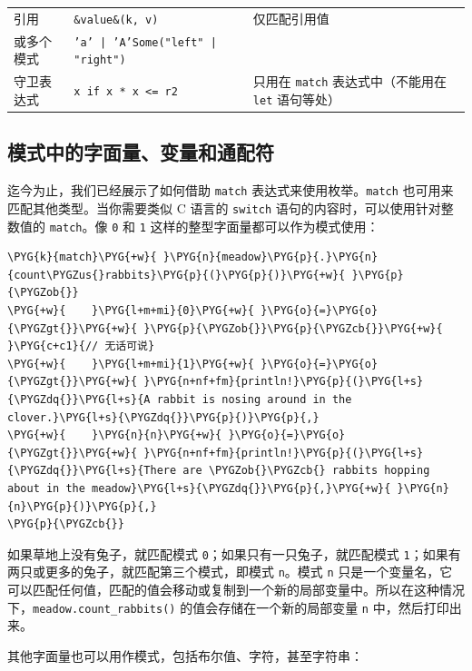 \begin{xltabular}{\textwidth}{@{}>{\hsize\raggedright\arraybackslash}X>{\hsize\raggedright\arraybackslash}X>{\hsize\raggedright\arraybackslash}X@{}}
引用 & \texttt{\&value}\newline{}\texttt{\&(k, v)} & 仅匹配引用值 \\
或多个模式 & \texttt{'a' | 'A'}\newline{}\texttt{Some("left" | "right")} &  \\
守卫表达式 & \texttt{x if x * x <= r2} & 只用在 \texttt{match} 表达式中（不能用在 \texttt{let} 语句等处） \\
\end{xltabular}
\myTableEnd

\subsection{模式中的字面量、变量和通配符}

迄今为止，我们已经展示了如何借助 \texttt{match} 表达式来使用枚举。\texttt{match} 也可用来匹配其他类型。当你需要类似 C 语言的 \texttt{switch} 语句的内容时，可以使用针对整数值的 \texttt{match}。像 \texttt{0} 和 \texttt{1} 这样的整型字面量都可以作为模式使用：

\begin{Verbatim}[commandchars=\\\{\},breaklines=true,breakanywhere=true,fontsize=\codefont,xleftmargin=17bp]
\PYG{k}{match}\PYG{+w}{ }\PYG{n}{meadow}\PYG{p}{.}\PYG{n}{count\PYGZus{}rabbits}\PYG{p}{(}\PYG{p}{)}\PYG{+w}{ }\PYG{p}{\PYGZob{}}
\PYG{+w}{    }\PYG{l+m+mi}{0}\PYG{+w}{ }\PYG{o}{=}\PYG{o}{\PYGZgt{}}\PYG{+w}{ }\PYG{p}{\PYGZob{}}\PYG{p}{\PYGZcb{}}\PYG{+w}{  }\PYG{c+c1}{// 无话可说}
\PYG{+w}{    }\PYG{l+m+mi}{1}\PYG{+w}{ }\PYG{o}{=}\PYG{o}{\PYGZgt{}}\PYG{+w}{ }\PYG{n+nf+fm}{println!}\PYG{p}{(}\PYG{l+s}{\PYGZdq{}}\PYG{l+s}{A rabbit is nosing around in the clover.}\PYG{l+s}{\PYGZdq{}}\PYG{p}{)}\PYG{p}{,}
\PYG{+w}{    }\PYG{n}{n}\PYG{+w}{ }\PYG{o}{=}\PYG{o}{\PYGZgt{}}\PYG{+w}{ }\PYG{n+nf+fm}{println!}\PYG{p}{(}\PYG{l+s}{\PYGZdq{}}\PYG{l+s}{There are \PYGZob{}\PYGZcb{} rabbits hopping about in the meadow}\PYG{l+s}{\PYGZdq{}}\PYG{p}{,}\PYG{+w}{ }\PYG{n}{n}\PYG{p}{)}\PYG{p}{,}
\PYG{p}{\PYGZcb{}}
\end{Verbatim}

如果草地上没有兔子，就匹配模式 \texttt{0}；如果只有一只兔子，就匹配模式 \texttt{1}；如果有两只或更多的兔子，就匹配第三个模式，即模式 \texttt{n}。模式 \texttt{n} 只是一个变量名，它可以匹配任何值，匹配的值会移动或复制到一个新的局部变量中。所以在这种情况下，\texttt{meadow.count\_rabbits()} 的值会存储在一个新的局部变量 \texttt{n} 中，然后打印出来。

其他字面量也可以用作模式，包括布尔值、字符，甚至字符串：

